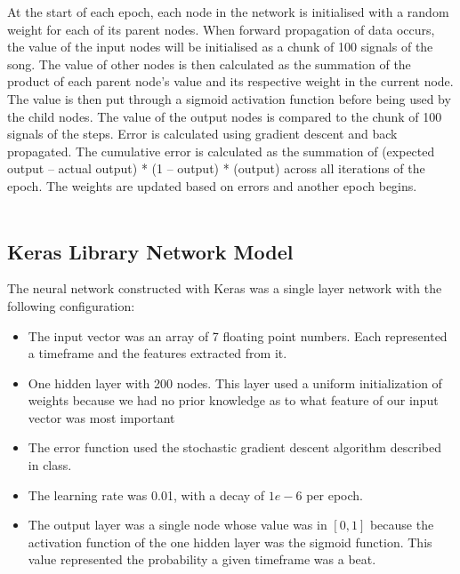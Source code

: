  At the start of each epoch, each node in the network is initialised with a random weight for each of its parent nodes. When forward propagation of data occurs, the value of the input nodes will be initialised as a chunk of 100 signals of the song. The value of other nodes is then calculated as the summation of the product of each parent node’s value and its respective weight in the current node. The value is then put through a sigmoid activation function before being used by the child nodes. The value of the output nodes is compared to the chunk of 100 signals of the steps. Error is calculated using gradient descent and back propagated. The cumulative error is calculated as the summation of (expected output – actual output) * (1 – output) * (output) across all iterations of the epoch. The weights are updated based on errors and another epoch begins. \\\\
 
\subsection{Keras Library Network Model}

The neural network constructed with Keras was a single layer network with the following configuration:

\begin{itemize}
	\item The input vector was an array of 7 floating point numbers. Each represented a timeframe and the features extracted from it.
	\item One hidden layer with 200 nodes. This layer used a uniform initialization of weights because we had no prior knowledge as to what feature of our input vector was most important
	\item The error function used the stochastic gradient descent algorithm described in class.
	\item The learning rate was 0.01, with a decay of $1e-6$ per epoch.
	\item The output layer was a single node whose value was in $[0,1]$ because the activation function of the one hidden layer was the sigmoid function. This value represented the probability a given timeframe was a beat.
\end{itemize}
 
